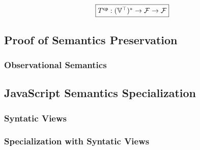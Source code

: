 \todo

\[
  \framebox{$\cptransform: (\valoptset)^* \rightarrow \funcset \rightarrow
  \funcset$}
\]

\todo





% 
% 
% 
% 








\subsection{Proof of Semantics Preservation}

\todo

\subsubsection{Observational Semantics}

\todo





\subsection{JavaScript Semantics Specialization}

\todo

\subsubsection{Syntatic Views}

\todo

\subsubsection{Specialization with Syntatic Views}

\todo
